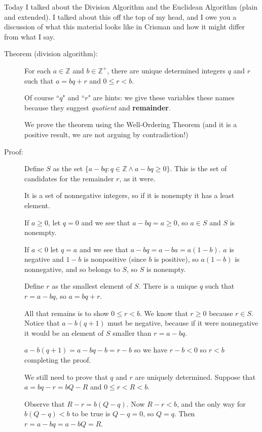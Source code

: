 \documentclass[12pt]{article}
\begin{document}
Today I talked about the Division Algorithm and the Euclidean Algorithm (plain and extended).  I talked about this off the top of my head, and I owe you a discussion of what this material looks like in Crisman and how it might differ from what I say.

\begin{description}

\item[Theorem (division algorithm):]  For each $a \in {\mathbb Z}$ and $b \in {\mathbb Z}^+$, there are unique determined integers $q$ and $r$ such that $a=bq+r$ and $0 \leq r <b$.

Of course ``$q$" and ``$r$" are hints:  we give these variables these names because they suggest {\em quotient\/} and {\bf remainder\/}.

We prove the theorem using the Well-Ordering Theorem (and it is a positive result, we are not arguing by contradiction!)

\item[Proof:]

Define $S$ as the set $\{a-bq:q \in {\mathbb Z} \wedge a-bq\geq 0\}$.  This is the set of candidates for the remainder $r$, as it were.

It is a set of nonnegative integers, so if it is nonempty it has a least element.

If $a\geq 0$, let $q=0$ and we see that $a-bq=a\geq 0$, so $a \in S$ and $S$ is nonempty.

If $a <0$ let $q=a$ and we see that $a-bq = a-ba=a(1-b)$.  $a$ is negative and $1-b$ is nonpositive (since $b$ is positive), so $a(1-b)$ is nonnegative, and so belongs to $S$, so $S$ is nonempty.

Define $r$ as the smallest element of $S$.  There is a unique $q$ such that $r=a-bq$, so $a=bq+r$.

All that remains is to show $0 \leq r<b$.  We know that $r \geq 0$ because $r \in S$.  Notice that $a-b(q+1)$ must be negative, because
if it were nonnegative it would be an element of $S$ smaller than $r=a-bq$.

$a-b(q+1) = a-bq-b=r-b$ so we have $r-b<0$ so $r<b$ completing the proof.


We still need to prove that $q$ and $r$ are uniquely determined.  Suppose that $a=bq-r = bQ-R$ and $0\leq r < R <b$.

Observe that $R-r = b(Q-q)$.  Now $R-r<b$, and the only way for $b(Q-q)<b$ to be true is $Q-q=0$, so $Q=q$.  Then $r=a-bq = a-bQ = R$.


\end{description}
\end{document}
